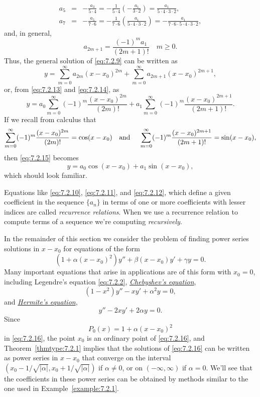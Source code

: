 \begin{examplesolution}
\begin{eqnarray*}
  a_{5} & = & -\frac{a_{3}}{5\cdot4}=-\frac{1}{5\cdot4}\left(-\frac{a_{1}}{3\cdot2}\right)=\frac{a_{1}}{5\cdot4\cdot3\cdot2}, \\
  a_{7} & = & -\frac{a_{5}}{7\cdot6}=-\frac{1}{7\cdot6}\left(\frac{a_{1}}{5\cdot4\cdot3\cdot2}\right)=-\frac{a_{1}}{7\cdot6\cdot5\cdot4\cdot3\cdot2},
\end{eqnarray*}
and, in general,
\begin{equation}
  \label{eq:7.2.14}a_{2m+1}=\frac{(-1)^{m}a_{1}}{(2m+1)!}\quad m\ge0.
\end{equation}
Thus, the general solution of \eqref{eq:7.2.9} can be written as
\[
  y=\sum_{m=0}^{\infty}a_{2m}(x-x_{0})^{2m}+\sum_{m=0}^{\infty}a_{2m+1}(x-x_{0})^{2m+1},
\]
or, from \eqref{eq:7.2.13} and \eqref{eq:7.2.14}, as
\begin{equation}
  \label{eq:7.2.15}y=a_{0}\sum_{m=0}^{\infty}(-1)^{m}\frac{(x-x_{0})^{2m}}{(2m)!}+a_{1}\sum_{m=0}^{\infty}(-1)^{m}\frac{(x-x_{0})^{2m+1}}{(2m+1)!}.
\end{equation}
If we recall from calculus that
\[
  \sum_{m=0}^{\infty}(-1)^{m}\frac{(x-x_{0})^{2m}}{(2m)!}=\cos(x-x_{0}) \mbox{\quad and \quad }\sum_{m=0}^{\infty}(-1)^{m}\frac{(x-x_{0})^{2m+1}}{(2m+1)!}=\sin(x-x_{0}),
\]
then \eqref{eq:7.2.15} becomes
\[
  y=a_{0}\cos(x-x_{0})+a_{1}\sin(x-x_{0}),
\]
which should look familiar. \bbox
\end{examplesolution}

Equations like \eqref{eq:7.2.10}, \eqref{eq:7.2.11}, and \eqref{eq:7.2.12}, which define a given
coefficient in the sequence $\{a_{n}\}$ in terms of one or more coefficients with lesser indices are
called {\color{blue}\it recurrence relations\/}. When we use a recurrence relation to compute terms
of a sequence we're computing {\color{blue}\it recursively\/}.

In the remainder of this section we consider the problem of finding power series solutions in
$x-x_{0}$ for equations of the form
\begin{equation}
  \label{eq:7.2.16}\left(1+\alpha(x-x_{0})^{2}\right)y''+\beta(x-x_{0})y'+\gamma y=0.
\end{equation}
Many important equations that arise in applications are of this form with $x_{0}=0$, including
Legendre's equation \eqref{eq:7.2.2}, \href{https://mathshistory.st-andrews.ac.uk/Biographies/Chebyshev/}{\color{blue}
\it Chebyshev's equation\/},
\[
  (1-x^{2})y''-xy'+\alpha^{2}y=0,
\]
and \href{https://mathshistory.st-andrews.ac.uk/Biographies/Hermite/}{\color{blue}
\it Hermite's equation},
\[
  y''-2xy'+2\alpha y=0.
\]
Since
\[
  P_{0}(x)=1+\alpha(x-x_{0})^{2}
\]
in \eqref{eq:7.2.16}, the point $x_{0}$ is an ordinary point of \eqref{eq:7.2.16}, and
Theorem~\ref{thmtype:7.2.1} implies that the solutions of \eqref{eq:7.2.16} can be written as power
series in $x-x_{0}$ that converge on the interval
$(x_{0}-1/\sqrt{|\alpha|},x_{0}+1/\sqrt{|\alpha|})$ if $\alpha\ne0$, or on $(-\infty,\infty)$ if
$\alpha=0$. We'll see that the coefficients in these power series can be obtained by methods similar
to the one used in Example~\ref{example:7.2.1}.

